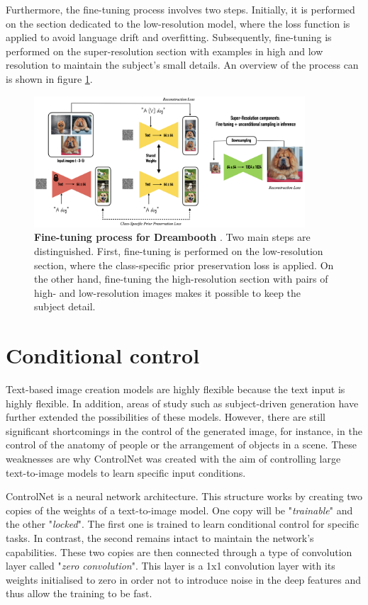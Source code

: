 Furthermore, the fine-tuning process involves two steps. Initially, it is performed on the section dedicated to the low-resolution model, where the loss function is applied to avoid language drift and overfitting. Subsequently, fine-tuning is performed on the super-resolution section with examples in high and low resolution to maintain the subject's small details. An overview of the process can is shown in figure \ref{fig:dreamboothS}.

\begin{figure}
    \centering
    \includegraphics[width=0.9\textwidth]{Pictures/dreamboothS.png} 
    \caption{\textbf{Fine-tuning process for Dreambooth} \cite{ruiz2022dreambooth}. Two main steps are distinguished. First, fine-tuning is performed on the low-resolution section, where the class-specific prior preservation loss is applied. On the other hand, fine-tuning the high-resolution section with pairs of high- and low-resolution images makes it possible to keep the subject detail.}
    \label{fig:dreamboothS}
\end{figure}

\section{Conditional control}

Text-based image creation models are highly flexible because the text input is highly flexible. In addition, areas of study such as subject-driven generation have further extended the possibilities of these models. However, there are still significant shortcomings in the control of the generated image, for instance, in the control of the anatomy of people or the arrangement of objects in a scene. These weaknesses are why ControlNet \cite{zhang2023adding} was created with the aim of controlling large text-to-image models to learn specific input conditions. 

ControlNet is a neural network architecture. This structure works by creating two copies of the weights of a text-to-image model. One copy will be "\textit{trainable}" and the other "\textit{locked}". The first one is trained to learn conditional control for specific tasks. In contrast, the second remains intact to maintain the network's capabilities. These two copies are then connected through a type of convolution layer called "\textit{zero convolution}". This layer is a 1x1 convolution layer with its weights initialised to zero in order not to introduce noise in the deep features and thus allow the training to be fast. 

